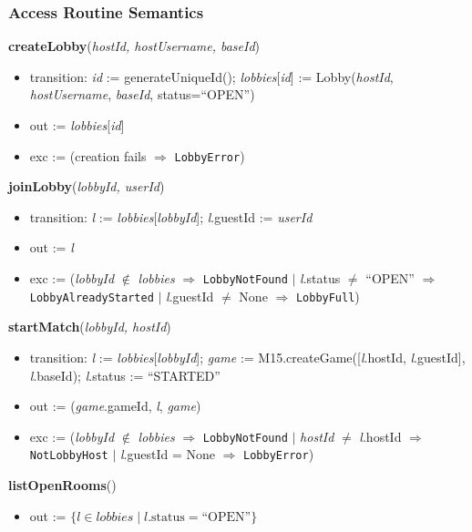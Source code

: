 \documentclass[12pt, titlepage]{article}
\begin{document}
\subsubsection{Access Routine Semantics}

\noindent\textbf{createLobby}(\textit{hostId, hostUsername, baseId})
\begin{itemize}
    \item transition: \textit{id} := generateUniqueId(); \textit{lobbies}[\textit{id}] := Lobby(\textit{hostId}, \textit{hostUsername}, \textit{baseId}, status=``OPEN'')
    \item out := \textit{lobbies}[\textit{id}]
    \item exc := (creation fails $\Rightarrow$ \texttt{LobbyError})
\end{itemize}

\noindent\textbf{joinLobby}(\textit{lobbyId, userId})
\begin{itemize}
    \item transition: \textit{l} := \textit{lobbies}[\textit{lobbyId}]; \textit{l}.guestId := \textit{userId}
    \item out := \textit{l}
    \item exc := (\textit{lobbyId} $\notin$ \textit{lobbies} $\Rightarrow$ \texttt{LobbyNotFound} $|$ \textit{l}.status $\neq$ ``OPEN'' $\Rightarrow$ \texttt{LobbyAlreadyStarted} $|$ \textit{l}.guestId $\neq$ None $\Rightarrow$ \texttt{LobbyFull})
\end{itemize}

\noindent\textbf{startMatch}(\textit{lobbyId, hostId})
\begin{itemize}
    \item transition: \textit{l} := \textit{lobbies}[\textit{lobbyId}]; \textit{game} := M15.createGame([\textit{l}.hostId, \textit{l}.guestId], \textit{l}.baseId); \textit{l}.status := ``STARTED''
    \item out := (\textit{game}.gameId, \textit{l}, \textit{game})
    \item exc := (\textit{lobbyId} $\notin$ \textit{lobbies} $\Rightarrow$ \texttt{LobbyNotFound} $|$ \textit{hostId} $\neq$ \textit{l}.hostId $\Rightarrow$ \texttt{NotLobbyHost} $|$ \textit{l}.guestId = None $\Rightarrow$ \texttt{LobbyError})
\end{itemize}

\noindent\textbf{listOpenRooms}()
\begin{itemize}
    \item out := $\{\textit{l} \in \textit{lobbies} \mid \textit{l}.\text{status} = \text{``OPEN''}\}$
\end{itemize}
\end{document}
